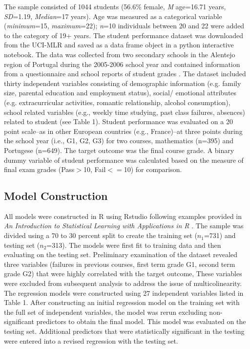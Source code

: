 \documentclass[sigconf]{acmart}
\begin{document}
The sample consisted of 1044 students (56.6\% female, \textit{M} age=16.71 
years, \textit{SD}=1.19, \textit{Median}=17 years). Age was measured as 
a categorical variable (\textit{minimum}=15, \textit{maximum}=22); 
\textit{n}=10 individuals between 20 and 22 were added to the category of 
19+ years. The student performance dataset was downloaded from the UCI-MLR 
and saved as a data frame object in a python interactive notebook. The data 
was collected from two secondary schools in the Alentejo region of Portugal 
during the 2005-2006 school year and contained information from a 
questionnaire and school reports of student grades \cite{cortez09}. 
The dataset included thirty independent variables consisting of demographic 
information (e.g. family size, parental education and employment status), 
social/ emotional attributes (e.g. extracurricular activities, romantic
relationship, alcohol consumption), school related variables (e.g., weekly 
time studying, past class failures, absences) related to student
(see Table 1). Student performance was evaluated on a 20 point scale--as in 
other European countries (e.g., France)--at three points during the school 
year (i.e., G1, G2, G3) for two courses, mathematics (n=395) and Portugese 
(n=649). The target outcome was the final course grade. A binary dummy
variable of student performance was calculated based on the measure of 
final exam grades (Pass$>$10, Fail$<=$10) for comparison.


\subsection{Model Construction}

All models were constructed in R using Rstudio following examples provided 
in \emph{An Introduction to Statistical Learning with Applications in R} 
\cite{jamesetal13}. The sample was divided using a 70 to 30 percent split to 
create the training set ($n_1$=731) and testing set ($n_2$=313). The models
were first fit to training data and then evaluating on the testing set. 
Preliminary examination of the dataset revealed three variables (failures in 
previous courses, first term grade G1, second term grade G2) that were highly 
correlated with the target outcome, These variables were excluded from 
subsequent analysis to address the issue of multicolinearity. The regression 
models were constructed using 27 independent variables listed in Table 1. 
After constructing an initial regression model on the training set with the
full set of independent variables, the model was rerun excluding non-
significant predictors to obtain the final model. This model was evaluated
on the testing set. Additional predictors that were statistically significant 
in the testing were entered into a revised regression with the testing set. 
\end{document}
